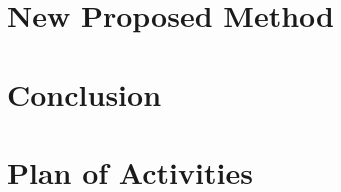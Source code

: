 \documentclass{article} %
\begin{document}
\section{New Proposed Method}
\label{sec:New}

\section{Conclusion}
\label{sec:Conclusion}
\section{Plan of Activities}
\label{sec:Plan}



\end{document}
